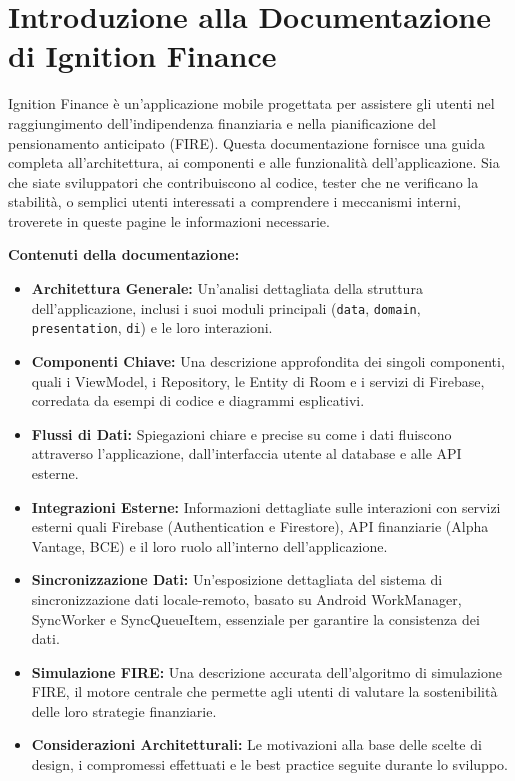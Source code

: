 \documentclass{article}
\begin{document}
\section*{Introduzione alla Documentazione di Ignition Finance}

Ignition Finance è un'applicazione mobile progettata per assistere gli utenti
nel raggiungimento dell'indipendenza finanziaria e nella pianificazione del
pensionamento anticipato (FIRE). Questa documentazione fornisce una guida
completa all'architettura, ai componenti e alle funzionalità dell'applicazione.
Sia che siate sviluppatori che contribuiscono al codice, tester che ne
verificano la stabilità, o semplici utenti interessati a comprendere i
meccanismi interni, troverete in queste pagine le informazioni necessarie.
\vspace{0.5cm}

\textbf{Contenuti della documentazione:}

\begin{itemize}
    \item \textbf{Architettura Generale:} Un'analisi dettagliata della struttura
    dell'applicazione, inclusi i suoi moduli principali (\texttt{data},
    \texttt{domain}, \texttt{presentation}, \texttt{di}) e le loro interazioni.
    \item \textbf{Componenti Chiave:} Una descrizione approfondita dei singoli
    componenti, quali i ViewModel, i Repository, le Entity di Room e i servizi
    di Firebase, corredata da esempi di codice e diagrammi esplicativi.
    \item \textbf{Flussi di Dati:} Spiegazioni chiare e precise su come i dati
    fluiscono attraverso l'applicazione, dall'interfaccia utente al database e
    alle API esterne.
    \item \textbf{Integrazioni Esterne:} Informazioni dettagliate sulle
    interazioni con servizi esterni quali Firebase (Authentication e Firestore),
    API finanziarie (Alpha Vantage, BCE) e il loro ruolo all'interno
    dell'applicazione.
    \item \textbf{Sincronizzazione Dati:} Un'esposizione dettagliata del sistema
    di sincronizzazione dati locale-remoto, basato su Android WorkManager,
    SyncWorker e SyncQueueItem, essenziale per garantire la consistenza dei
    dati.
    \item \textbf{Simulazione FIRE:} Una descrizione accurata dell'algoritmo di
    simulazione FIRE, il motore centrale che permette agli utenti di valutare la
    sostenibilità delle loro strategie finanziarie.
    \item \textbf{Considerazioni Architetturali:} Le motivazioni alla base delle
    scelte di design, i compromessi effettuati e le best practice seguite
    durante lo sviluppo.
\end{itemize}
\end{document}
